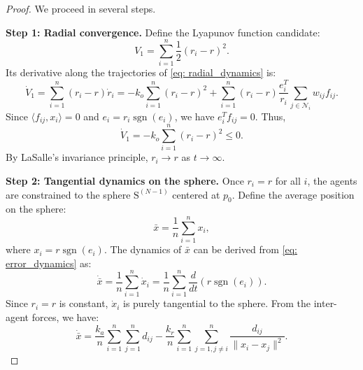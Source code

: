 \documentclass{ctexart}
\DeclareMathOperator{\sgn}{sgn}
\begin{document}
\begin{proof}
We proceed in several steps.

\textbf{Step 1: Radial convergence.}
Define the Lyapunov function candidate:
\begin{equation}
V_1 = \sum_{i=1}^{n} \frac{1}{2}(r_i - r)^2.
\end{equation}
Its derivative along the trajectories of \eqref{eq: radial_dynamics} is:
\begin{equation}
\dot{V}_1 = \sum_{i=1}^{n} (r_i - r)\dot{r}_i = -k_o \sum_{i=1}^{n} (r_i - r)^2 + \sum_{i=1}^{n} (r_i - r) \frac{e_i^T}{r_i} \sum_{j \in \mathcal{N}_i} w_{ij} f_{ij}.
\end{equation}
Since $\langle f_{ij}, x_i \rangle = 0$ and $e_i = r_i \sgn(e_i)$, we have $e_i^T f_{ij} = 0$.
Thus,
\begin{equation}
\dot{V}_1 = -k_o \sum_{i=1}^{n} (r_i - r)^2 \leq 0.
\end{equation}
By LaSalle's invariance principle, $r_i \to r$ as $t \to \infty$.

\textbf{Step 2: Tangential dynamics on the sphere.}
Once $r_i = r$ for all $i$, the agents are constrained to the sphere $\mathrm{S}^{(N-1)}$ centered at $p_0$.
Define the average position on the sphere:
\begin{equation}
\bar{x} = \frac{1}{n} \sum_{i=1}^{n} x_i,
\end{equation}
where $x_i = r \sgn(e_i)$.
The dynamics of $\bar{x}$ can be derived from \eqref{eq: error_dynamics} as:
\begin{equation}
\dot{\bar{x}} = \frac{1}{n} \sum_{i=1}^{n} \dot{x}_i = \frac{1}{n} \sum_{i=1}^{n} \frac{d}{dt}(r \sgn(e_i)).
\end{equation}
Since $r_i = r$ is constant, $\dot{x}_i$ is purely tangential to the sphere.
From the inter-agent forces, we have:
\begin{equation}
\dot{\bar{x}} = \frac{k_a}{n} \sum_{i=1}^{n} \sum_{j=1}^{n} d_{ij} - \frac{k_r}{n} \sum_{i=1}^{n} \sum_{j=1, j \neq i}^{n} \frac{d_{ij}}{\|x_i - x_j\|^2}.
\label{eq: average_dynamics}
\end{equation}


\end{proof}
\end{document}
